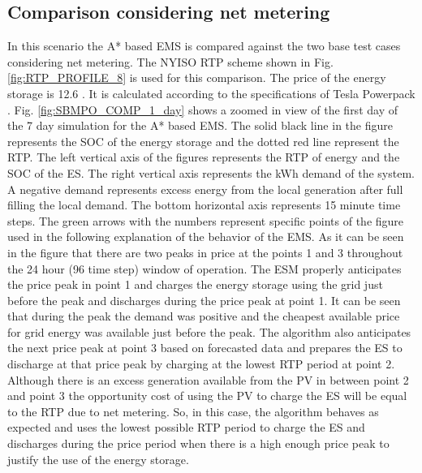 \subsection{Comparison considering net metering} \label{netmeter}
In this scenario the A* based EMS is compared against the two base test cases considering net metering. The NYISO RTP scheme shown in Fig. \ref{fig:RTP_PROFILE_8} is used for this comparison. The price of the energy storage is 12.6 \cent. It is calculated according to the specifications of Tesla Powerpack \cite{tesla_powerpack_2018}.
Fig. \ref{fig:SBMPO_COMP_1_day} shows a zoomed in view of the first day of the 7 day simulation for the A* based EMS. The solid black line in the figure represents the SOC of the energy storage and the dotted red line represent the RTP. The left vertical axis of the figures represents the RTP of energy and the SOC of the ES. The right vertical axis represents the kWh demand of the system. A negative demand represents excess energy from the local generation after full filling the local demand. The bottom horizontal axis represents 15 minute time steps. The green arrows with the numbers represent specific points of the figure used in the following explanation of the behavior of the EMS. As it can be seen in the figure that there are two peaks in price at the points 1 and 3 throughout the 24 hour (96 time step) window of operation.  The ESM properly anticipates the price peak in point 1 and charges the energy storage using the grid just before the peak and discharges during the price peak at point 1. It can be seen that during the peak the demand was positive and the cheapest available price for grid energy was available just before the peak. The algorithm also anticipates the next price peak at point 3 based on forecasted data and prepares the ES to discharge at that price peak by charging at the lowest RTP period at point 2. Although there is an excess generation available from the PV in between point 2 and point 3 the opportunity cost of using the PV to charge the ES will be equal to the RTP due to net metering. So, in this case, the algorithm behaves as expected and uses the lowest possible RTP period to charge the ES and discharges during the price period when there is a high enough price peak to justify the use of the energy storage.

